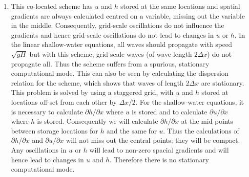 {\begin{enumerate}
\begin{eqnarray*}
 & = & \frac{1}{1+c^{2}\sin^{2}k\Delta x}.
\end{eqnarray*}
Thus $||A||^{2}\le1\ \forall\ c$ and $\forall\ k\Delta x$. Thus
this implicit scheme is unconditionally stable (stable for all time-steps).
\item This co-located scheme has $u$ and $h$ stored at the same locations
and spatial gradients are always calculated centred on a variable,
missing out the variable in the middle. Consequently, grid-scale oscillations
do not influence the gradients and hence grid-scale oscillations do
not lead to changes in $u$ or $h$. In the linear shallow-water equations,
all waves should propagate with speed $\sqrt{gH}$ but with this scheme,
grid-scale waves (of wave-length $2\Delta x$) do not propagate all.
Thus the scheme suffers from a spurious, stationary computational
mode. This can also be seen by calculating the dispersion relation
for the scheme, which shows that waves of length $2\Delta x$ are
stationary. This problem is solved by using a staggered grid, with
$u$ and $h$ stored at locations off-set from each other by $\Delta x/2$.
For the shallow-water equations, it is necessary to calculate $\partial h/\partial x$
where $u$ is stored and to calculate $\partial u/\partial x$ where
$h$ is stored. Consequently we will calculate $\partial h/\partial x$
at the mid-points between storage locations for $h$ and the same
for $u$. Thus the calculations of $\partial h/\partial x$ and $\partial u/\partial x$
will not miss out the central points; they will be compact. Any oscillations
in $u$ or $h$ will lead to non-zero spacial gradients and will hence
lead to changes in $u$ and $h$. Therefore there is no stationary
computational mode.
\end{enumerate}
}
